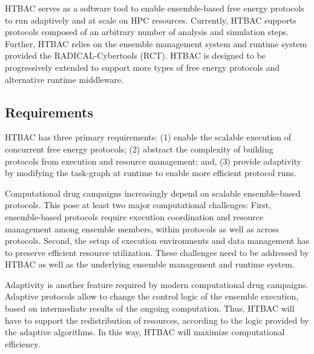 HTBAC serves as a software tool to enable ensemble-based free energy
protocols to run adaptively and at scale on HPC resources. Currently, HTBAC
supports protocols composed of an arbitrary number of analysis and simulation
steps. Further, HTBAC relies on the ensemble management system and runtime
system provided the RADICAL-Cybertools (RCT). HTBAC is designed to be
progressively extended to support more types of free energy protocols and
alternative runtime middleware.





\subsection{Requirements}

HTBAC has three primary requirements: (1) enable the scalable execution of
concurrent free energy protocols; (2) abstract the complexity of building
protocols from execution and resource management; and, (3) provide adaptivity
by modifying the task-graph at runtime to enable more efficient protocol
runs.

Computational drug campaigns increasingly depend on scalable ensemble-based
protocols. This pose at least two major computational challenges: First,
ensemble-based protocols require execution coordination and resource
management among ensemble members, within protocols as well as across
protocols. Second, the setup of execution environments and data management
has to preserve efficient resource utilization. These challenges need to be
addressed by HTBAC as well as the underlying ensemble management and runtime
system.

Adaptivity is another feature required by modern computational drug
campaigns. Adaptive protocols allow to change the control logic of the
ensemble execution, based on intermediate results of the ongoing computation.
Thus, HTBAC will have to support the redistribution of resources, according
to the logic provided by the adaptive algorithms. In this way, HTBAC will
maximize computational efficiency.

